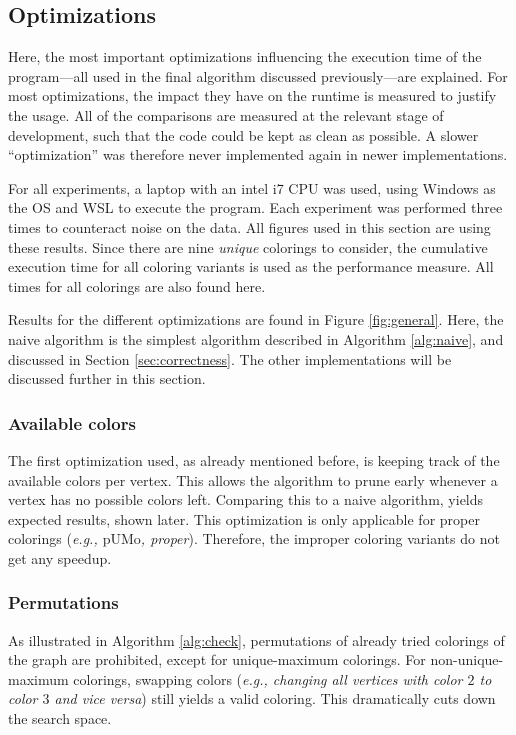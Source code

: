 \documentclass{article}
\begin{document}
\subsection{Optimizations}
\label{sec:optim}

Here, the most important optimizations influencing the execution time of the program---all used in the final algorithm discussed previously---are explained. For most optimizations, the impact they have on the runtime is measured to justify the usage. All of the comparisons are measured at the relevant stage of development, such that the code could be kept as clean as possible. A slower ``optimization'' was therefore never implemented again in newer implementations. 

For all experiments, a laptop with an intel i7 CPU was used, using Windows as the OS and WSL to execute the program. Each experiment was performed three times to counteract noise on the data.
All figures used in this section are using these results. Since there are nine \textit{unique} colorings to consider, the cumulative execution time for all coloring variants is used as the performance measure. All times for all colorings are also found here\footnotemark[1].

Results for the different optimizations are found in Figure \ref{fig:general}. Here, the naive algorithm is the simplest algorithm described in Algorithm \ref{alg:naive}, and discussed in Section \ref{sec:correctness}. The other implementations will be discussed further in this section.

\subsubsection{Available colors}

The first optimization used, as already mentioned before, is keeping track of the available colors per vertex. This allows the algorithm to prune early whenever a vertex has no possible colors left. Comparing this to a naive algorithm, yields expected results, shown later. This optimization is only applicable for proper colorings (\textit{e.g., $\mathrm{pUMo}$, proper}). Therefore, the improper coloring variants do not get any speedup. 

\subsubsection{Permutations}

As illustrated in Algorithm \ref{alg:check}, permutations of already tried colorings of the graph are prohibited, except for unique-maximum colorings. For non-unique-maximum colorings, swapping colors (\textit{e.g., changing all vertices with color $2$ to color $3$ and vice versa}) still yields a valid coloring. This dramatically cuts down the search space. 
\end{document}

